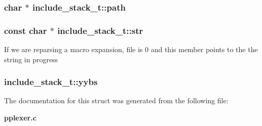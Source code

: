 \subsubsection{\setlength{\rightskip}{0pt plus 5cm}char $\ast$ include\_\-stack\_\-t::path}\label{structinclude__stack__t_m0}


\subsubsection{\setlength{\rightskip}{0pt plus 5cm}const char $\ast$ include\_\-stack\_\-t::str}\label{structinclude__stack__t_m2}


If we are reparsing a macro expansion, file is 0 and  this member points to the the string in progress 
\subsubsection{ include\_\-stack\_\-t::yybs}\label{structinclude__stack__t_m4}




The documentation for this struct was generated from the following file:\begin{CompactItemize}
\item 
{\bf pplexer.c}\end{CompactItemize}
